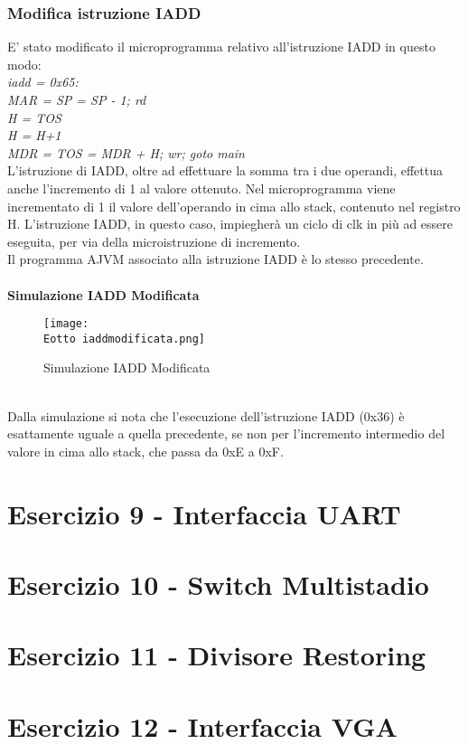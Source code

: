 \documentclass[12pt]{article}
\def \Eotto {Allegati/Esercizio8/}
\begin{document}
\subsubsection{Modifica istruzione IADD}
E’ stato modificato il microprogramma relativo all’istruzione IADD in questo modo:
\textit{
    \\iadd = 0x65:
    \\\hspace*{2cm} MAR = SP = SP - 1; rd
    \\\hspace*{2cm} H = TOS
    \\\hspace*{2cm} H = H+1
    \\\hspace*{2cm} MDR = TOS = MDR + H; wr; goto main
}
\\L’istruzione di IADD, oltre ad effettuare la somma tra i due operandi, effettua anche l’incremento di 1 al valore ottenuto. Nel microprogramma viene incrementato di 1 il valore dell’operando in cima allo stack, contenuto nel registro H. L’istruzione IADD, in questo caso, impiegherà un ciclo di clk in più ad essere eseguita, per via della microistruzione di incremento.
\\Il programma AJVM associato alla istruzione IADD è lo stesso precedente.
\\\\{\large \textbf{Simulazione IADD Modificata}}
\begin{figure}[ht]
    \centering
    \texttt{[image: \\Eotto iaddmodificata.png]}
    \caption{Simulazione IADD Modificata}
\end{figure}
\\Dalla simulazione si nota che l’esecuzione dell’istruzione IADD (0x36) è esattamente uguale a quella precedente, se non per l’incremento intermedio del valore in cima allo stack, che passa da 0xE a 0xF.

\clearpage
\section{Esercizio 9 - Interfaccia UART}
\newpage
\section{Esercizio 10 - Switch Multistadio}
\newpage
\section{Esercizio 11 - Divisore Restoring}
\newpage
\section{Esercizio 12 - Interfaccia VGA}

\newpage
\listoffigures
\end{document}
